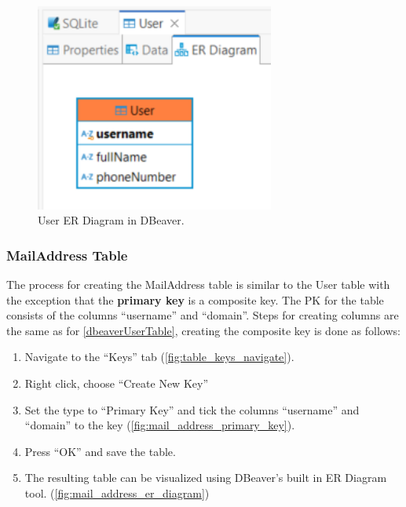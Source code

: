 \documentclass[a4paper,11pt,oneside]{article}
\begin{document}
\begin{sloppypar}
\begin{figure}[!htb]
  \centering
  \includegraphics[width=0.7\textwidth]{dbeaver/user_er_diagram.png}
  \caption{User ER Diagram in DBeaver.}
  \label{fig:user_er_diagram}
\end{figure}


\subsubsection{MailAddress Table}
\label{dbeaverMailAddressTable}
The process for creating the MailAddress table is similar to the User table with the exception that the \textbf{primary key} is a composite key. The PK for the table consists of the columns ``username'' and ``domain''. Steps for creating columns are the same as for \ref{dbeaverUserTable}, creating the composite key is done as follows:
\begin{enumerate}
  \item Navigate to the ``Keys'' tab (\autoref{fig:table_keys_navigate}).
  \item Right click, choose ``Create New Key''
  \item Set the type to ``Primary Key'' and tick the columns ``username'' and ``domain'' to the key (\autoref{fig:mail_address_primary_key}).
  \item Press ``OK'' and save the table.
  \item The resulting table can be visualized using DBeaver's built in ER Diagram tool. (\autoref{fig:mail_address_er_diagram})
\end{enumerate}


\end{sloppypar}
\end{document}
